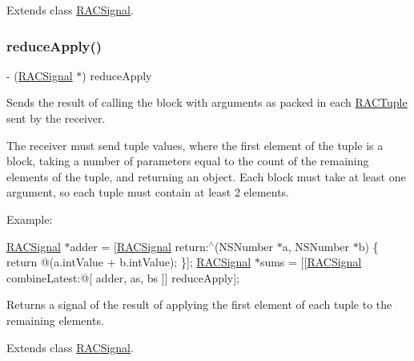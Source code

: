 Extends class \mbox{\hyperlink{interface_r_a_c_signal_a16f260eea2cfd9a3953b95926d442a93}{R\+A\+C\+Signal}}.

\mbox{\label{category_r_a_c_signal_07_operations_08_a60241be15dba6de172d2ab14be09b657}} 
\subsubsection{\texorpdfstring{reduce\+Apply()}{reduceApply()}\hspace{0.1cm}{\footnotesize\ttfamily [1/3]}}
{\footnotesize\ttfamily -\/ (\mbox{\hyperlink{interface_r_a_c_signal}{R\+A\+C\+Signal}} $\ast$) reduce\+Apply \begin{DoxyParamCaption}{ }\end{DoxyParamCaption}}

Sends the result of calling the block with arguments as packed in each \mbox{\hyperlink{interface_r_a_c_tuple}{R\+A\+C\+Tuple}} sent by the receiver.

The receiver must send tuple values, where the first element of the tuple is a block, taking a number of parameters equal to the count of the remaining elements of the tuple, and returning an object. Each block must take at least one argument, so each tuple must contain at least 2 elements.

Example\+:

\mbox{\hyperlink{interface_r_a_c_signal}{R\+A\+C\+Signal}} $\ast$adder = \mbox{[}\mbox{\hyperlink{interface_r_a_c_signal}{R\+A\+C\+Signal}} return\+:$^\wedge$(N\+S\+Number $\ast$a, N\+S\+Number $\ast$b) \{ return @(a.\+int\+Value + b.\+int\+Value); \}\mbox{]}; \mbox{\hyperlink{interface_r_a_c_signal}{R\+A\+C\+Signal}} $\ast$sums = \mbox{[}\mbox{[}\mbox{\hyperlink{interface_r_a_c_signal}{R\+A\+C\+Signal}} combine\+Latest\+:@\mbox{[} adder, as, bs \mbox{]}\mbox{]} reduce\+Apply\mbox{]};

Returns a signal of the result of applying the first element of each tuple to the remaining elements. 

Extends class \mbox{\hyperlink{interface_r_a_c_signal_a60241be15dba6de172d2ab14be09b657}{R\+A\+C\+Signal}}.

\mbox{\label{category_r_a_c_signal_07_operations_08_a60241be15dba6de172d2ab14be09b657}} 
